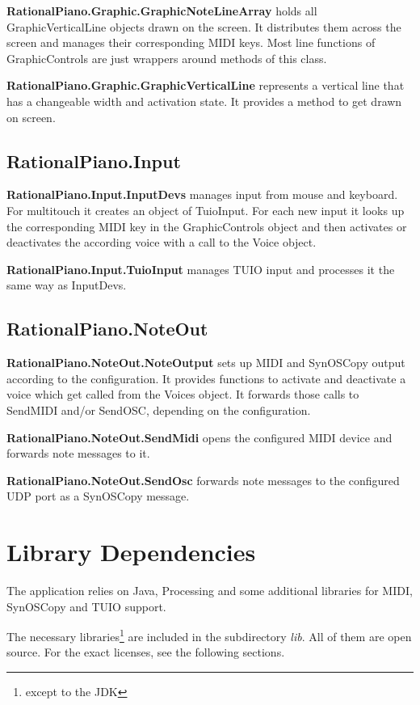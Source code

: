 \documentclass[12pt,a4paper,titlepage,oneside]{report}
\begin{document}
\textbf{RationalPiano.Graphic.GraphicNoteLineArray} holds all GraphicVerticalLine objects drawn on the screen. It distributes them across the screen and manages their corresponding MIDI keys. Most line functions of GraphicControls are just wrappers around methods of this class.

\textbf{RationalPiano.Graphic.GraphicVerticalLine} represents a vertical line that has a changeable width and activation state. It provides a method to get drawn on screen.


\subsection{RationalPiano.Input}

\textbf{RationalPiano.Input.InputDevs} manages input from mouse and keyboard. For multitouch it creates an object of TuioInput. For each new input it looks up the corresponding MIDI key in the GraphicControls object and then activates or deactivates the according voice with a call to the Voice object.

\textbf{RationalPiano.Input.TuioInput} manages TUIO input and processes it the same way as InputDevs.


\subsection{RationalPiano.NoteOut}

\textbf{RationalPiano.NoteOut.NoteOutput} sets up MIDI and SynOSCopy output according to the configuration. It provides functions to activate and deactivate a voice which get called from the Voices object. It forwards those calls to SendMIDI and/or SendOSC, depending on the configuration.

\textbf{RationalPiano.NoteOut.SendMidi} opens the configured MIDI device and forwards note messages to it.

\textbf{RationalPiano.NoteOut.SendOsc} forwards note messages to the configured UDP port as a SynOSCopy message.


\section{Library Dependencies}
\label{sec:libdep}

The application relies on Java, Processing and some additional libraries for MIDI, SynOSCopy and TUIO support.

The necessary libraries\footnote{except to the JDK} are included in the subdirectory \textit{lib}. All of them are open source. For the exact licenses, see the following sections.
\end{document}
